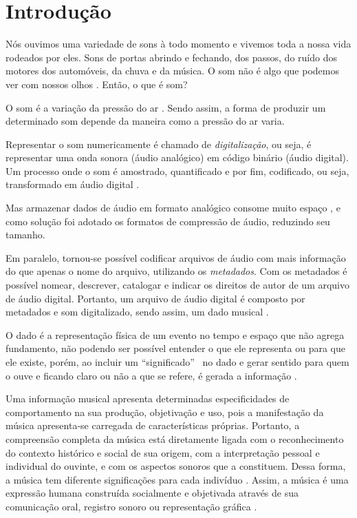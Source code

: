 \chapter{Introdução} \label{cap:introducao}
Nós ouvimos uma variedade de sons à todo momento e vivemos toda a nossa vida rodeados por eles. Sons de portas abrindo e fechando, dos passos, do ruído dos motores dos automóveis, da chuva e da música. O som não é algo que podemos ver com nossos olhos \cite{miletto2004}. Então, o que é som?

O som é a variação da pressão do ar \cite{muller2007}. Sendo assim, a forma de produzir um determinado som depende da maneira como a pressão do ar varia. 

Representar o som numericamente é chamado de \textit{digitalização}, ou seja, é representar uma onda sonora (áudio analógico) em código binário (áudio digital). Um processo onde o som é amostrado, quantificado e por fim, codificado, ou seja, transformado em áudio digital \cite{paulozuben2004}.

Mas armazenar dados de áudio em formato analógico consome muito espaço \cite{juliana2004}, e como solução foi adotado os formatos de compressão de áudio, reduzindo seu tamanho.

Em paralelo, tornou-se possível codificar arquivos de áudio com mais informação do que apenas o nome do arquivo, utilizando os \textit{metadados}. Com os metadados é possível nomear, descrever, catalogar e indicar os direitos de autor de um arquivo de áudio digital. Portanto, um arquivo de áudio digital é composto por metadados e som digitalizado, sendo assim, um dado musical . 

O dado é a representação física de um evento no tempo e espaço que não agrega fundamento, não podendo ser possível entender o que ele representa ou para que ele existe, porém, ao incluir um “significado” \ no dado e gerar sentido para quem o ouve e ficando claro ou não a que se refere, é gerada a informação \cite{rafael2013}.

Uma informação musical apresenta determinadas especificidades de comportamento na sua produção, objetivação e uso, pois a manifestação da música apresenta-se carregada de características próprias. Portanto, a compreensão completa da música está diretamente ligada com o reconhecimento do contexto histórico e social de sua origem, com a interpretação pessoal e individual do ouvinte, e com os aspectos sonoros que a constituem. Dessa forma, a música tem diferente significações para cada indivíduo \cite{michels1992}. Assim, a música é uma expressão humana construída socialmente e objetivada através de sua comunicação oral, registro sonoro ou representação gráfica \cite{barros2012}.


